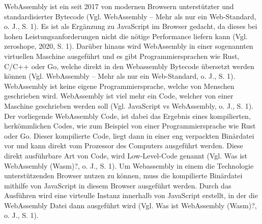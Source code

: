 WebAssembly ist ein seit 2017 von modernen Browsern unterstützter und standardisierter Bytecode (Vgl. WebAssembly – Mehr als nur ein Web-Standard, o. J., S. 1). Es ist als Ergänzung zu JavaScript im Browser gedacht, da dieses bei hohen Leistungsanforderungen nicht die nötige Performance liefern kann (Vgl. zeroshope, 2020, S. 1).
Darüber hinaus wird WebAssembly in einer sogenannten virtuellen Maschine ausgeführt und es gibt Programmiersprachen wie Rust, C/C++ oder Go, welche direkt in den Webassembly Bytecode übersetzt werden können (Vgl. WebAssembly – Mehr als nur ein Web-Standard, o. J., S. 1).
WebAssembly ist keine eigene Programmiersprache, welche von Menschen geschrieben wird. WebAssembly ist viel mehr ein Code, welcher von einer Maschine geschrieben werden soll (Vgl. JavaScript vs WebAssembly, o. J., S. 1). Der vorliegende WebAssembly Code, ist dabei das Ergebnis eines kompilierten, herkömmlichen Codes, wie zum Beispiel von einer Programmiersprache wie Rust oder Go. Dieser kompilierte Code, liegt dann in einer eng verpackten Binärdatei vor und kann direkt vom Prozessor des Computers ausgeführt werden. Diese direkt ausführbare Art von Code, wird Low-Level-Code genannt (Vgl. Was ist WebAssembly (Wasm)?, o. J., S. 1).
Um Webassembly in einem die Technologie unterstützenden Browser nutzen zu können, muss die kompilierte Binärdatei mithilfe von JavaScript in diesem Browser ausgeführt werden. Durch das Ausführen wird eine virteulle Instanz innerhalb von JavaScript erstellt, in der die WebAssembly Datei dann ausgeführt wird (Vgl. Was ist WebAssembly (Wasm)?, o. J., S. 1).
